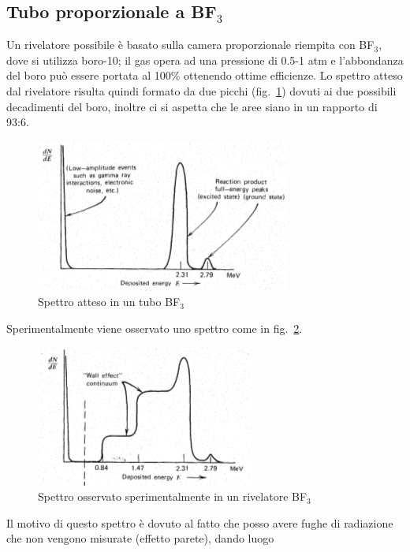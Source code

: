 \subsection{Tubo proporzionale a BF$_3$}
Un rivelatore possibile \`e basato sulla camera proporzionale riempita con BF$_3$, dove si utilizza boro-10;
il gas opera ad una pressione di 0.5-1 atm e l'abbondanza del boro pu\`o essere portata al 100\% ottenendo ottime efficienze.
Lo spettro atteso dal rivelatore risulta quindi formato da due picchi (fig.~\ref{fig:spettroAttesoBF3}) dovuti ai due possibili decadimenti del boro,
inoltre ci si aspetta che le aree siano in un rapporto di 93:6.
\begin{figure}[htbp]
\begin{center}
\includegraphics[scale=1]{./Immagini/SpettroAttesoBF3.png}
\caption{Spettro atteso in un tubo BF$_3$}
\label{fig:spettroAttesoBF3}
\end{center}
\end{figure}
Sperimentalmente viene osservato uno spettro come in fig.~\ref{fig:spettroSperimentaleBF3}.
\begin{figure}[htbp]
\begin{center}
\includegraphics[scale=1]{./Immagini/SpettroSperimentaleBF3.png}
\caption{Spettro osservato sperimentalmente in un rivelatore BF$_3$}
\label{fig:spettroSperimentaleBF3}
\end{center}
\end{figure}
Il motivo di questo spettro \`e dovuto al fatto che posso avere fughe di radiazione che non vengono misurate (effetto parete), dando luogo
